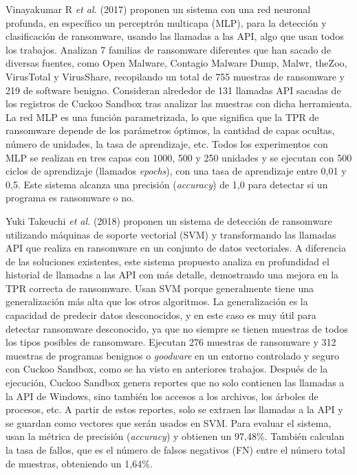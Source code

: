 Vinayakumar R \textit{et al.} (2017) \cite{shallow} proponen un sistema con una red neuronal profunda, en específico un perceptrón multicapa (\gls{MLP}), para la detección y clasificación de ransomware, usando las llamadas a las \gls{API}, algo que usan todos los trabajos. Analizan 7 familias de ransomware diferentes que han sacado de diversas fuentes, como Open Malware, Contagio Malware Dump, Malwr, theZoo, VirusTotal y VirusShare, recopilando un total de 755 muestras de ransomware y 219 de software benigno. Consideran alrededor de 131 llamadas \gls{API} sacadas de los registros de Cuckoo Sandbox tras analizar las muestras con dicha herramienta. La red \gls{MLP} es una función parametrizada, lo que significa que la \gls{TPR} de ransomware depende de los parámetros óptimos, la cantidad de capas ocultas, número de unidades, la tasa de aprendizaje, etc. Todos los experimentos con \gls{MLP} se realizan en tres capas con 1000, 500 y 250 unidades y se ejecutan con 500 ciclos de aprendizaje (llamados \textit{epochs}), con una tasa de aprendizaje entre 0,01 y 0,5. Este sistema alcanza una precisión (\textit{accuracy}) de 1,0 para detectar si un programa es ransomware o no.

Yuki Takeuchi \textit{et al.} (2018) \cite{detectingSVM} proponen un sistema de detección de ransomware utilizando máquinas de soporte vectorial (\gls{SVM}) y transformando las llamadas \gls{API} que realiza en ransomware en un conjunto de datos vectoriales. A diferencia de las soluciones existentes, este sistema propuesto analiza en profundidad el historial de llamadas a las \gls{API} con más detalle, demostrando una mejora en la \gls{TPR} correcta de ransomware. Usan \gls{SVM} porque generalmente tiene una generalización más alta que los otros algoritmos. La generalización es la capacidad de predecir datos desconocidos, y en este caso es muy útil para detectar ransomware desconocido, ya que no siempre se tienen muestras de todos los tipos posibles de ransomware. Ejecutan 276 muestras de ransomware y 312 muestras de programas benignos o \textit{goodware} en un entorno controlado y seguro con Cuckoo Sandbox, como se ha visto en anteriores trabajos. Después de la ejecución, Cuckoo Sandbox genera reportes que no solo contienen las llamadas a la \gls{API} de Windows, sino también los accesos a los archivos, los árboles de procesos, etc. A partir de estos reportes, solo se extraen las llamadas a la \gls{API} y se guardan como vectores que serán usados en \gls{SVM}. Para evaluar el sistema, usan la métrica de precisión (\textit{accuracy}) y obtienen un 97,48\%. También calculan la tasa de fallos, que es el número de falsos negativos (\gls{FN}) entre el número total de muestras, obteniendo un 1,64\%.

